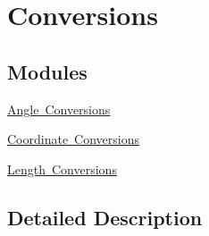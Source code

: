 \hypertarget{group___e_g_x_math-_conversions}{}\section{Conversions}
\label{group___e_g_x_math-_conversions}
\subsection*{Modules}
\begin{DoxyCompactItemize}
\item 
\mbox{\hyperlink{group___e_g_x_math-_conversions-_angle_conversions}{Angle Conversions}}
\item 
\mbox{\hyperlink{group___e_g_x_math-_conversions-_coordinate_conversions}{Coordinate Conversions}}
\item 
\mbox{\hyperlink{group___e_g_x_math-_conversions-_length_conversions}{Length Conversions}}
\end{DoxyCompactItemize}


\subsection{Detailed Description}
